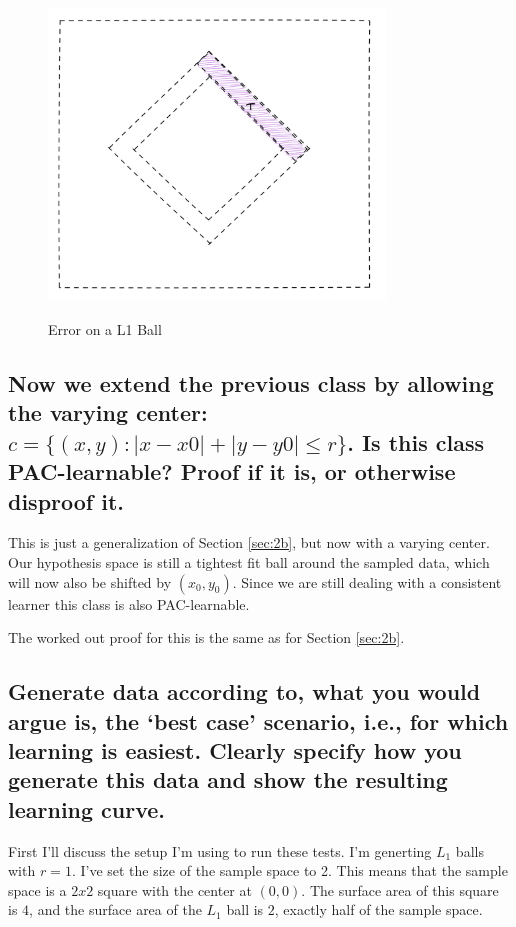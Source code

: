 \documentclass[11pt,a4paper]{article}
\begin{document}
\begin{figure}[h]
    \caption{Error on a L1 Ball}
    \centering
    \includegraphics[width=0.8\textwidth]{l1ball.png}
    \label{fig:l1_ball}
\end{figure}

\subsection{Now we extend the previous class by allowing the varying center: $c = \{(x, y) : |x − x0| + |y − y0| ≤ r\}$. Is this class PAC-learnable? Proof if it is, or otherwise disproof it.}
\label{sec:2c}

This is just a generalization of Section \ref{sec:2b}, but now with a varying center. Our hypothesis space is still a tightest fit ball around the sampled data, which will now also be shifted by $(x_0, y_0)$. Since we are still dealing with a consistent learner this class is also PAC-learnable.

The worked out proof for this is the same as for Section \ref{sec:2b}.

\subsection{Generate data according to, what you would argue is, the ‘best case’ scenario, i.e., for
which learning is easiest. Clearly specify how you generate this data and show the resulting
learning curve.}

First I'll discuss the setup I'm using to run these tests. I'm generting $L_1$ balls with $r=1$. I've set the size of the sample space to 2. This means that the sample space is a $2x2$ square with the center at $(0,0)$. The surface area of this square is $4$, and the surface area of the $L_1$ ball is $2$, exactly half of the sample space.
\end{document}
